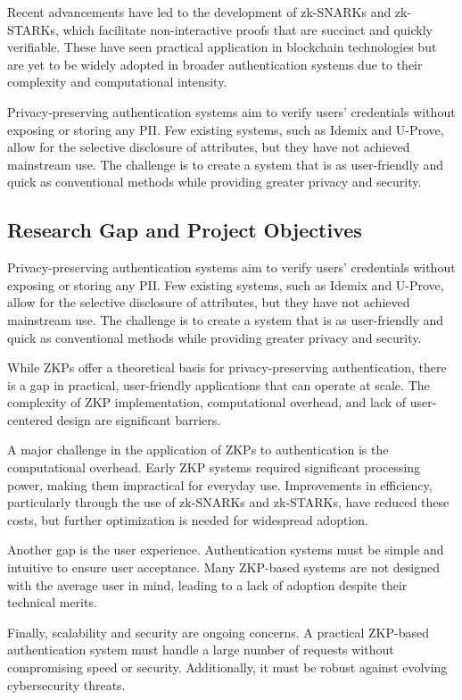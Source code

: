 Recent advancements have led to the development of zk-SNARKs and zk-STARKs, which facilitate non-interactive proofs that are succinct and quickly verifiable. These have seen practical application in blockchain technologies but are yet to be widely adopted in broader authentication systems due to their complexity and computational intensity.

Privacy-preserving authentication systems aim to verify users' credentials without exposing or storing any PII. Few existing systems, such as Idemix and U-Prove, allow for the selective disclosure of attributes, but they have not achieved mainstream use. The challenge is to create a system that is as user-friendly and quick as conventional methods while providing greater privacy and security.

\subsection{Research Gap and Project Objectives}

Privacy-preserving authentication systems aim to verify users' credentials without exposing or storing any PII. Few existing systems, such as Idemix and U-Prove, allow for the selective disclosure of attributes, but they have not achieved mainstream use. The challenge is to create a system that is as user-friendly and quick as conventional methods while providing greater privacy and security.

While ZKPs offer a theoretical basis for privacy-preserving authentication, there is a gap in practical, user-friendly applications that can operate at scale. The complexity of ZKP implementation, computational overhead, and lack of user-centered design are significant barriers.

A major challenge in the application of ZKPs to authentication is the computational overhead. Early ZKP systems required significant processing power, making them impractical for everyday use. Improvements in efficiency, particularly through the use of zk-SNARKs and zk-STARKs, have reduced these costs, but further optimization is needed for widespread adoption.

Another gap is the user experience. Authentication systems must be simple and intuitive to ensure user acceptance. Many ZKP-based systems are not designed with the average user in mind, leading to a lack of adoption despite their technical merits.

Finally, scalability and security are ongoing concerns. A practical ZKP-based authentication system must handle a large number of requests without compromising speed or security. Additionally, it must be robust against evolving cybersecurity threats.
